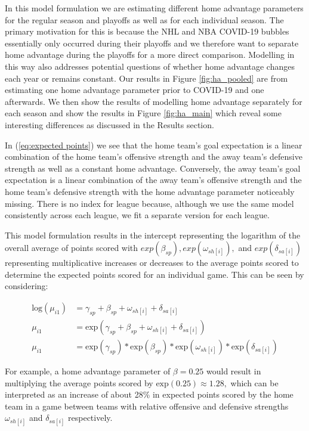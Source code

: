 In this model formulation we are estimating different home advantage parameters for the regular season and playoffs as well as for each individual season. The primary motivation for this is because the NHL and NBA COVID-19 bubbles essentially only occurred during their playoffs and we therefore want to separate home advantage during the playoffs for a more direct comparison. Modelling in this way also addresses potential questions of whether home advantage changes each year or remains constant. Our results in Figure \mbox{\ref{fig:ha_pooled}} are from estimating one home advantage parameter prior to COVID-19 and one afterwards. We then show the results of modelling home advantage separately for each season and show the results in Figure \mbox{\ref{fig:ha_main}} which reveal some interesting differences as discussed in the Results section.

In (\ref{eq:expected points}) we see that the home team's goal expectation is a linear combination of the home team's offensive strength and the away team's defensive strength as well as a constant home advantage. Conversely, the away team's goal expectation is a linear combination of the away team's offensive strength and the home team's defensive strength with the home advantage parameter noticeably missing. There is no index for league because, although we use the same model consistently across each league, we fit a separate version for each league.

This model formulation results in the intercept representing the logarithm of the overall average of points scored with \(exp(\beta_{sp}), exp(\omega_{sh[i]}),\) and \(exp(\delta_{sa[i]})\) representing multiplicative increases or decreases to the average points scored to determine the expected points scored for an individual game. This can be seen by considering:

\begin{equation}
\begin{split}
\text{log}(\mu_{i1}) &= \gamma_{sp} + \beta_{sp} + \omega_{sh[i]} + \delta_{sa[i]} \\
\mu_{i1} &= \text{exp}(\gamma_{sp} + \beta_{sp} + \omega_{sh[i]} + \delta_{sa[i]}) \\
\mu_{i1} &= \text{exp}(\gamma_{sp})*\text{exp}(\beta_{sp})*\text{exp}(\omega_{sh[i]})*\text{exp}(\delta_{sa[i]})
\end{split}
\end{equation}

For example, a home advantage parameter of \(\beta = 0.25\) would result in multiplying the average points scored by \(\text{exp}(0.25) \approx 1.28,\) which can be interpreted as an increase of about 28\% in expected points scored by the home team in a game between teams with relative offensive and defensive strengths \(\omega_{sh[i]}\) and \(\delta_{sa[i]}\) respectively.

